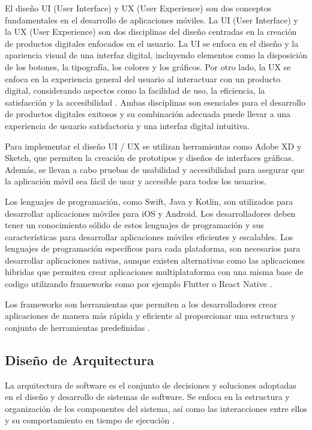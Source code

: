\documentclass[runningheads]{llncs}
\begin{document}
            El diseño UI (User Interface) y UX (User Experience) son dos conceptos fundamentales en el desarrollo de aplicaciones móviles. La UI (User Interface) y la UX (User Experience) son dos disciplinas del diseño centradas en la creación de productos digitales enfocados en el usuario. La UI se enfoca en el diseño y la apariencia visual de una interfaz digital, incluyendo elementos como la disposición de los botones, la tipografía, los colores y los gráficos. Por otro lado, la UX se enfoca en la experiencia general del usuario al interactuar con un producto digital, considerando aspectos como la facilidad de uso, la eficiencia, la satisfacción y la accesibilidad \cite{Cita6}. Ambas disciplinas son esenciales para el desarrollo de productos digitales exitosos y su combinación adecuada puede llevar a una experiencia de usuario satisfactoria y una interfaz digital intuitiva. 

            Para implementar el diseño UI / UX se utilizan herramientas como Adobe XD y Sketch, que permiten la creación de prototipos y diseños de interfaces gráficas. Además, se llevan a cabo pruebas de usabilidad y accesibilidad para asegurar que la aplicación móvil sea fácil de usar y accesible para todos los usuarios.

            Los lenguajes de programación, como Swift, Java y Kotlin, son utilizados para desarrollar aplicaciones móviles para iOS y Android. Los desarrolladores deben tener un conocimiento sólido de estos lenguajes de programación y sus características para desarrollar aplicaciones móviles eficientes y escalables. Los lenguajes de programación específicos para cada plataforma, son necesarios para desarrollar aplicaciones nativas, aunque existen alternativas como las aplicaciones hibridas que permiten crear aplicaciones multiplataforma con una misma base de codigo utilizando frameworks como por ejemplo Flutter o React Native \cite{Cita7}.

            Los frameworks son herramientas que permiten a los desarrolladores crear aplicaciones de manera más rápida y eficiente al proporcionar una estructura y conjunto de herramientas predefinidas \cite{Cita8}. 

        \subsection{Diseño de Arquitectura}
            La arquitectura de software es el conjunto de decisiones y soluciones adoptadas en el diseño y desarrollo de sistemas de software. Se enfoca en la estructura y organización de los componentes del sistema, así como las interacciones entre ellos y su comportamiento en tiempo de ejecución \cite{Cita9}.
\end{document}
